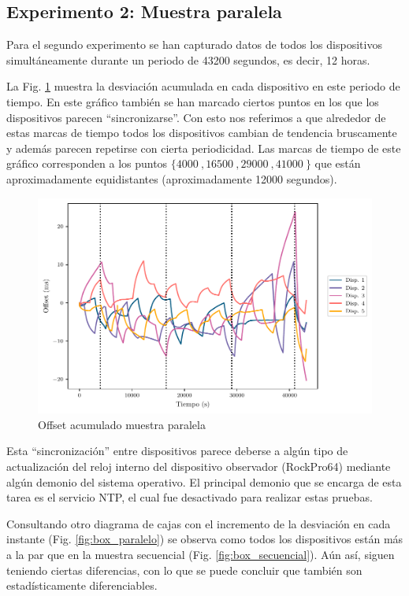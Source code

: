 \subsection{Experimento 2: Muestra paralela}

Para el segundo experimento se han capturado datos de todos los dispositivos simultáneamente durante un periodo de \SI{43200}{} segundos, es decir, \SI{12}{} horas.

La Fig. \ref{fig:off_acu_paralelo} muestra la desviación acumulada en cada dispositivo en este periodo de tiempo. En este gráfico también se han marcado ciertos puntos en los que los dispositivos parecen ``sincronizarse''. Con esto nos referimos a que alrededor de estas marcas de tiempo todos los dispositivos cambian de tendencia bruscamente y además parecen repetirse con cierta periodicidad. Las marcas de tiempo de este gráfico corresponden a los puntos $\{\SI{4000}{},  \SI{16500}{}, \SI{29000}{}, \SI{41000}{}\}$ que están aproximadamente equidistantes (aproximadamente \SI{12000}{} segundos).

\begin{figure}[htpb!]
    \centering
    \includegraphics[scale=0.75]{../Python/plots/parallel/offset_plot}
    \caption{Offset acumulado muestra paralela}
    \label{fig:off_acu_paralelo}
\end{figure}

Esta ``sincronización'' entre dispositivos parece deberse a algún tipo de actualización del reloj interno del dispositivo observador (RockPro64) mediante algún demonio del sistema operativo. El principal demonio que se encarga de esta tarea es el servicio NTP, el cual fue desactivado para realizar estas pruebas. 

Consultando otro diagrama de cajas con el incremento de la desviación en cada instante (Fig. \ref{fig:box_paralelo}) se observa como todos los dispositivos están más a la par que en la muestra secuencial (Fig. \ref{fig:box_secuencial}). Aún así, siguen teniendo ciertas diferencias, con lo que se puede concluir que también son estadísticamente diferenciables.


